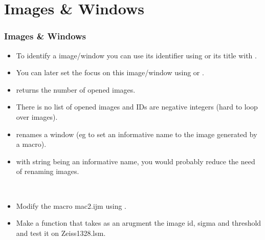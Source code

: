 \section{Images \& Windows}

\begin{frame}
  \frametitle{Images \& Windows}
  \begin{itemize}
  \item To identify a image/window you can use its identifier using
     or its title with .
  \item You can later set the focus on this image/window using
     or .
  \item {} returns the number of opened images.
  \item There is no list of opened images and IDs are negative
    integers (hard to loop over images).
  \item {} renames a window (eg to set an informative name
    to the image generated by a macro).
  \item {} with string being an informative
    name, you would probably reduce the need of renaming images.
  \end{itemize}
\end{frame}

\begin{frame}[fragile]
  \begin{example}~\par
	    \begin{itemize}
		    \item Modify the macro mac2.ijm using .
		    \item Make a function that takes as an arugment the image id, sigma and threshold and test it on Zeiss1328.lsm.
		    \end{itemize}
	    
	  \end{example}
\end{frame}

